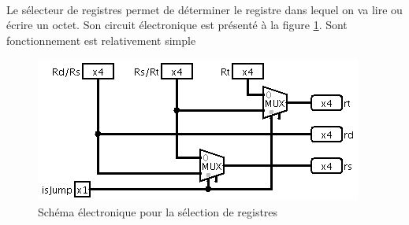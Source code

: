 \paragraph{}{
	Le sélecteur de registres permet de déterminer le registre
	dans lequel on va lire ou écrire un octet. Son circuit électronique
	est présenté à la figure \ref{selec_reg_circ}.
	Sont fonctionnement est relativement simple
}

\begin{figure}
	\centering
	\includegraphics[scale=0.8,origin=c]{circuits/selec_reg.png}
	\caption{
		\label{selec_reg_circ}
		Sch\'{e}ma \'{e}lectronique pour la s\'{e}lection de registres
	}
\end{figure}